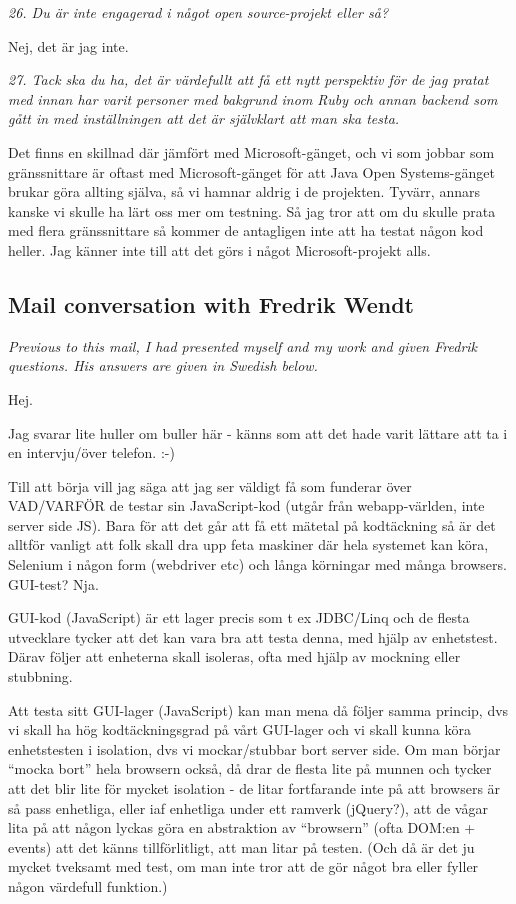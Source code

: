\documentclass[11pt]{article}
\begin{document}
\emph{26. Du är inte engagerad i något open source-projekt eller så?}

Nej, det är jag inte.

\emph{27. Tack ska du ha, det är värdefullt att få ett nytt perspektiv för de jag pratat med innan har varit personer med bakgrund inom Ruby och annan backend som gått in med inställningen att det är självklart att man ska testa.}

Det finns en skillnad där jämfört med Microsoft-gänget, och vi som jobbar som gränssnittare är oftast med Microsoft-gänget för att Java Open Systems-gänget brukar göra allting själva, så vi hamnar aldrig i de projekten. Tyvärr, annars kanske vi skulle ha lärt oss mer om testning. Så jag tror att om du skulle prata med flera gränssnittare så kommer de antagligen inte att ha testat någon kod heller. Jag känner inte till att det görs i något Microsoft-projekt alls.

\subsection*{Mail conversation with Fredrik Wendt}

\emph{Previous to this mail, I had presented myself and my work and given Fredrik questions. His answers are given in Swedish below.}

Hej.

Jag svarar lite huller om buller här - känns som att det hade varit
lättare att ta i en intervju/över telefon. :-)

Till att börja vill jag säga att jag ser väldigt få som funderar över
VAD/VARFÖR de testar sin JavaScript-kod (utgår från webapp-världen, inte
server side JS). Bara för att det går att få ett mätetal på %
kodtäckning så är det alltför vanligt att folk skall dra upp feta
maskiner där hela systemet kan köra, Selenium i någon form (webdriver
etc) och långa körningar med många browsers. GUI-test? Nja.

GUI-kod (JavaScript) är ett lager precis som t ex JDBC/Linq och de
flesta utvecklare tycker att det kan vara bra att testa denna, med hjälp
av enhetstest. Därav följer att enheterna skall isoleras, ofta med hjälp
av mockning eller stubbning.

Att testa sitt GUI-lager (JavaScript) kan man mena då följer samma
princip, dvs vi skall ha hög kodtäckningsgrad på vårt GUI-lager och vi
skall kunna köra enhetstesten i isolation, dvs vi mockar/stubbar bort
server side. Om man börjar ``mocka bort'' hela browsern också, då drar de
flesta lite på munnen och tycker att det blir lite för mycket isolation
- de litar fortfarande inte på att browsers är så pass enhetliga, eller
iaf enhetliga under ett ramverk (jQuery?), att de vågar lita på att
någon lyckas göra en abstraktion av ``browsern'' (ofta DOM:en + events)
att det känns tillförlitligt, att man litar på testen. (Och då är det ju
mycket tveksamt med test, om man inte tror att de gör något bra eller
fyller någon värdefull funktion.)
\end{document}
